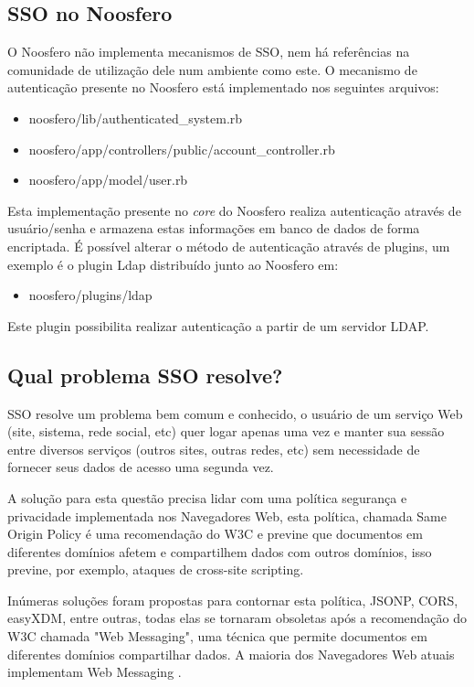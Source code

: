 \documentclass[11pt]{article}
\begin{document}
\subsection{SSO no Noosfero}

O Noosfero não implementa mecanismos de SSO, nem há referências na comunidade
de utilização dele num ambiente como este. O mecanismo de autenticação presente
no Noosfero está implementado nos seguintes arquivos:

\begin{itemize}
  \item noosfero/lib/authenticated\_system.rb
  \item noosfero/app/controllers/public/account\_controller.rb
  \item noosfero/app/model/user.rb
\end{itemize}

Esta implementação presente no {\it core} do Noosfero realiza autenticação
através de usuário/senha e armazena estas informações em banco de dados de
forma encriptada. É possível alterar o método de autenticação através de
plugins, um exemplo é o plugin Ldap distribuído junto ao Noosfero em:

\begin{itemize}
  \item noosfero/plugins/ldap
\end{itemize}

Este plugin possibilita realizar autenticação a partir de um servidor LDAP.

\subsection{Qual problema SSO resolve?}

SSO resolve um problema bem comum e conhecido, o usuário de um serviço Web
(site, sistema, rede social, etc) quer logar apenas uma vez e manter sua
sessão entre diversos serviços (outros sites, outras redes, etc) sem
necessidade de fornecer seus dados de acesso uma segunda vez.

A solução para esta questão precisa lidar com uma política segurança e
privacidade implementada nos Navegadores Web, esta política, chamada Same
Origin Policy\cite{wikipediaSameOriginPolicy} é
uma recomendação do W3C e previne que documentos em diferentes domínios afetem
e compartilhem dados com outros domínios, isso previne, por exemplo, ataques de
cross-site scripting.

Inúmeras soluções foram propostas para contornar esta política, JSONP, CORS,
easyXDM, entre outras\cite{stackoverflowAjax}, todas elas se tornaram
obsoletas após a recomendação do W3C chamada "Web
Messaging"\cite{w3cWebmessaging}, uma técnica que permite documentos em
diferentes domínios compartilhar dados. A maioria dos Navegadores Web atuais
implementam Web Messaging\cite{wikipediaWebmessaging}
\cite{stackexchangeJSONP} \cite{webMessagingOpenBlog}.
\end{document}
